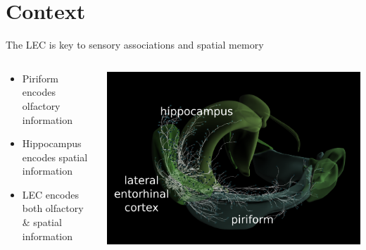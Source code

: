 \documentclass[bigger]{beamer}
\begin{document}
\section*{Context}
\label{sec:orgb70afd6}
\begin{frame}[label={sec:org9f9f41f}]{The LEC is key to sensory associations and spatial memory}
\begin{columns}
\begin{column}{0.45\columnwidth}
\footnotesize
\begin{itemize}
\item \alert{Piriform} encodes olfactory information
\item \alert{Hippocampus} encodes spatial information
\item \alert{LEC} encodes both olfactory \& spatial information
\end{itemize}
\end{column}
\begin{column}{0.55\columnwidth}
\begin{center}
\includegraphics[width=\textwidth]{img/brain.png}
\end{center}
\end{column}
\end{columns}
\end{frame}
\end{document}
